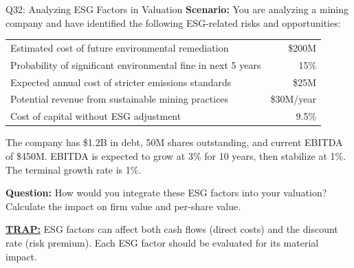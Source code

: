 \documentclass{beamer}
\renewcommand{\scriptsize}{\fontsize{6pt}{7pt}\selectfont}
\begin{document}
	\begin{frame}{Q32: Analyzing ESG Factors in Valuation}
		\scriptsize
		\textbf{Scenario:} You are analyzing a mining company and have identified the following ESG-related risks and opportunities:
		
		\begin{tabular}{lr}
			Estimated cost of future environmental remediation & \$200M \\
			Probability of significant environmental fine in next 5 years & 15\% \\
			Expected annual cost of stricter emissions standards & \$25M \\
			Potential revenue from sustainable mining practices & \$30M/year \\
			Cost of capital without ESG adjustment & 9.5\% \\
		\end{tabular}
		
		The company has \$1.2B in debt, 50M shares outstanding, and current EBITDA of \$450M. EBITDA is expected to grow at 3\% for 10 years, then stabilize at 1\%. The terminal growth rate is 1\%.
		
		\textbf{Question:} How would you integrate these ESG factors into your valuation? Calculate the impact on firm value and per-share value.
		
		\vspace{2pt}
		\underline{\textbf{TRAP:}} ESG factors can affect both cash flows (direct costs) and the discount rate (risk premium). Each ESG factor should be evaluated for its material impact.
	\end{frame}
	
\end{document}
